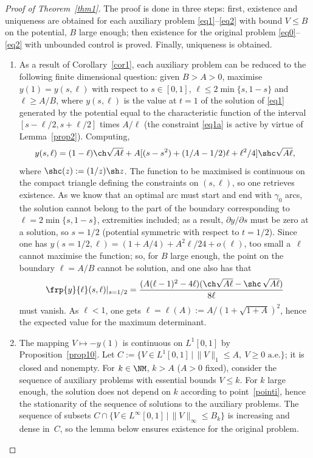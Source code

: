 \begin{proof}[Proof of Theorem~\ref{thm1}] The proof is done in three steps: first,
existence and uniqueness are obtained for each auxiliary problem \eqref{eq1}--\eqref{eq2}
with bound $V \leq B$ on the potential, $B$ large enough;
then existence for the original problem
\eqref{eq0}--\eqref{eq2} with unbounded control is proved. Finally, uniqueness is obtained.

\begin{enumerate}
\item\label{pointi}
As a result of Corollary~\ref{cor1}, each auxiliary problem can be reduced
to the following finite dimensional question: given $B>A>0$, maximise
$y(1)=y(s,\ell)$ with respect to $s \in [0,1]$, $\ell \leq 2\min\{s,1-s\}$ and $\ell
\geq A/B$, where $y(s,\ell)$
is the value at $t=1$ of the solution of \eqref{eq1} generated by the
potential equal to the characteristic function of the interval $[s-\ell/2,s+\ell/2]$
times $A/\ell$ (the constraint \eqref{eq1a} is active by virtue
of Lemma~\ref{prop2}). Computing,
\[
y(s,\ell) = (1-\ell)\ch \sqrt{A\ell}
+A[(s-s^2)+(1/A-1/2)\ell+\ell^2/4]\shc \sqrt{A\ell},
\]
where $\shc(z):=(1/z)\sh z$.
The function to be maximised is continuous
on the compact triangle defining the constraints on $(s,\ell)$,
so one retrieves existence. As we know that an optimal arc must start and end with
$\gamma_0$ arcs, the solution cannot belong to the part of the boundary corresponding
to $\ell=2\min\{s,1-s\}$, extremities included; as a result, $\partial y/\partial s$
must be zero at a solution, so $s=1/2$ (potential symmetric with respect to $t=1/2$). Since
one has $y(s=1/2,\ell)=(1+A/4)+A^2\ell/24+o(\ell)$, too small a~$\ell$ cannot
maximise the function; so, for $B$ large enough, the point on the boundary
$\ell=A/B$ cannot be solution, and one also has that
\[
\frp{y}{\ell}(s,\ell)|_{s=1/2} =
\frac{(A(\ell-1)^2-4\ell)(\ch \sqrt{A\ell}-\shc\,\sqrt{A\ell})}{8\ell}
\]
must vanish. As $\ell<1$, one gets
$\ell=\ell(A):=A/(1+\sqrt{1+A})^2$, hence the expected value for the maximum determinant.

\item\label{pointii}
The mapping $V \mapsto -y(1)$ is continuous on $L^1[0,1]$ by
Proposition~\ref{prop10}.
Let $C:=\{V \in L^1[0,1]\,|\,\|V\|_1 \leq A,\ V \geq 0 \text{ a.e.}\}$; it is closed
and nonempty.
For $k \in \NM$, $k>A$ ($A>0$ fixed),
consider the sequence
of auxiliary problems with essential bounds $V \leq k$.
For $k$ large enough, the solution does not depend on $k$ according to point~\eqref{pointi},
hence the stationarity of the sequence of solutions to the auxiliary problems.
The sequence of subsets $C \cap \{V \in L^\infty[0,1]\,|\,\|V\|_\infty \leq B_k\}$
is increasing and dense in~$C$, so the lemma below ensures existence for the
original problem.
\end{enumerate}


\end{proof}
